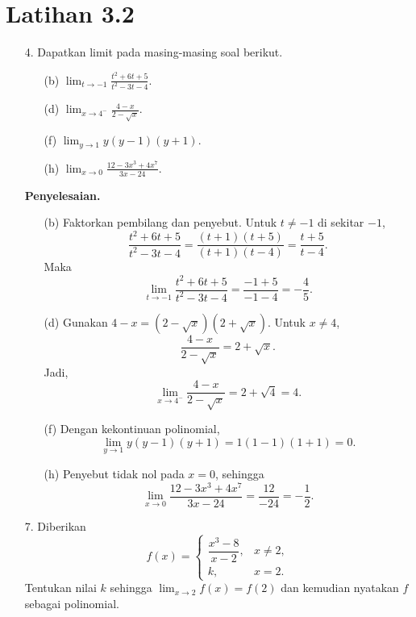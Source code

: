 \documentclass[11pt,a4paper]{article}
\newcommand{\jawab}{\par\medskip\textbf{Penyelesaian.}\par}
\begin{document}
\section*{Latihan 3.2}
\begin{enumerate}

\item[4.] Dapatkan limit pada masing-masing soal berikut.
\begin{enumerate}
    \item[(b)] $\displaystyle\lim_{t\to -1}\frac{t^2+6t+5}{t^2-3t-4}$.
    \item[(d)] $\displaystyle\lim_{x\to 4^-}\frac{4-x}{2-\sqrt{x}}$.
    \item[(f)] $\displaystyle\lim_{y\to 1}y(y-1)(y+1)$.
    \item[(h)]$\displaystyle\lim_{x\to 0}\frac{12-3x^3+4x^7}{3x-24}$.
\end{enumerate}

\jawab
\begin{enumerate}
    \item[(b)] Faktorkan pembilang dan penyebut. Untuk $t\neq -1$ di sekitar
    $-1$,
    \[
        \frac{t^2+6t+5}{t^2-3t-4}
        =\frac{(t+1)(t+5)}{(t+1)(t-4)}=\frac{t+5}{t-4}.
    \]
    Maka
    \[
        \lim_{t\to -1}\frac{t^2+6t+5}{t^2-3t-4}
        =\frac{-1+5}{-1-4}=\boxed{-\frac45}.
    \]

    \item[(d)] Gunakan $4-x=(2-\sqrt{x})(2+\sqrt{x})$. Untuk $x\neq4$,
    \[
        \frac{4-x}{2-\sqrt{x}}=2+\sqrt{x}.
    \]
    Jadi,
    \[
        \lim_{x\to4^-}\frac{4-x}{2-\sqrt{x}}
        =2+\sqrt4=\boxed4.
    \]

    \item[(f)] Dengan kekontinuan polinomial,
    \[
        \lim_{y\to1}y(y-1)(y+1)=1(1-1)(1+1)=\boxed0.
    \]

    \item[(h)] Penyebut tidak nol pada $x=0$, sehingga
    \[
        \lim_{x\to0}\frac{12-3x^3+4x^7}{3x-24}
        =\frac{12}{-24}=\boxed{-\frac12}.
    \]
\end{enumerate}

\item[7.] Diberikan
\[
    f(x)=
    \begin{cases}
        \dfrac{x^3-8}{x-2}, & x\neq2,\\[6pt]
        k, & x=2.
    \end{cases}
\]
Tentukan nilai $k$ sehingga $\displaystyle\lim_{x\to2}f(x)=f(2)$ dan
kemudian nyatakan $f$ sebagai polinomial.


\end{enumerate}
\end{document}
